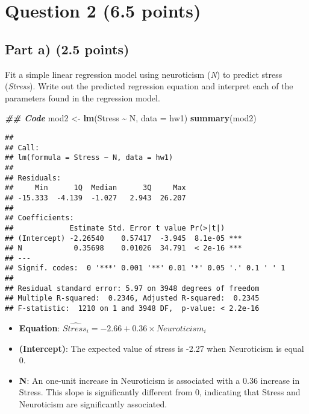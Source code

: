 \documentclass[
]{article}
\newenvironment{Shaded}{\begin{snugshade}}{\end{snugshade}}
\newcommand{\AttributeTok}[1]{\textcolor[rgb]{0.13,0.29,0.53}{#1}}
\newcommand{\DocumentationTok}[1]{\textcolor[rgb]{0.56,0.35,0.01}{\textbf{\textit{#1}}}}
\newcommand{\FunctionTok}[1]{\textcolor[rgb]{0.13,0.29,0.53}{\textbf{#1}}}
\newcommand{\NormalTok}[1]{#1}
\newcommand{\OtherTok}[1]{\textcolor[rgb]{0.56,0.35,0.01}{#1}}
\newcommand{\SpecialCharTok}[1]{\textcolor[rgb]{0.81,0.36,0.00}{\textbf{#1}}}
\begin{document}
\hypertarget{question-2-6.5-points}{%
\section{\texorpdfstring{Question 2 \textbf{(6.5
points)}}{Question 2 (6.5 points)}}\label{question-2-6.5-points}}

\hypertarget{part-a-2.5-points}{%
\subsection{\texorpdfstring{Part a) \textbf{(2.5
points)}}{Part a) (2.5 points)}}\label{part-a-2.5-points}}

Fit a simple linear regression model using neuroticism (\emph{N}) to
predict stress (\emph{Stress}). Write out the predicted regression
equation and interpret each of the parameters found in the regression
model.

\begin{Shaded}
\begin{Highlighting}[]
\DocumentationTok{\#\# Code}
\NormalTok{mod2 }\OtherTok{\textless{}{-}} \FunctionTok{lm}\NormalTok{(Stress }\SpecialCharTok{\textasciitilde{}}\NormalTok{ N, }\AttributeTok{data =}\NormalTok{ hw1)}
\FunctionTok{summary}\NormalTok{(mod2)}
\end{Highlighting}
\end{Shaded}

\begin{verbatim}
## 
## Call:
## lm(formula = Stress ~ N, data = hw1)
## 
## Residuals:
##     Min      1Q  Median      3Q     Max 
## -15.333  -4.139  -1.027   2.943  26.207 
## 
## Coefficients:
##             Estimate Std. Error t value Pr(>|t|)    
## (Intercept) -2.26540    0.57417  -3.945  8.1e-05 ***
## N            0.35698    0.01026  34.791  < 2e-16 ***
## ---
## Signif. codes:  0 '***' 0.001 '**' 0.01 '*' 0.05 '.' 0.1 ' ' 1
## 
## Residual standard error: 5.97 on 3948 degrees of freedom
## Multiple R-squared:  0.2346, Adjusted R-squared:  0.2345 
## F-statistic:  1210 on 1 and 3948 DF,  p-value: < 2.2e-16
\end{verbatim}

\begin{itemize}
\item
  \textbf{Equation}:
  \(\widehat{Stress_i} = -2.66 + 0.36 \times Neuroticism_i\)
\item
  \textbf{(Intercept)}: The expected value of stress is -2.27 when
  Neuroticism is equal 0.
\item
  \textbf{N}: An one-unit increase in Neuroticism is associated with a
  0.36 increase in Stress. This slope is significantly different from 0,
  indicating that Stress and Neuroticism are significantly associated.
\end{itemize}
\end{document}
